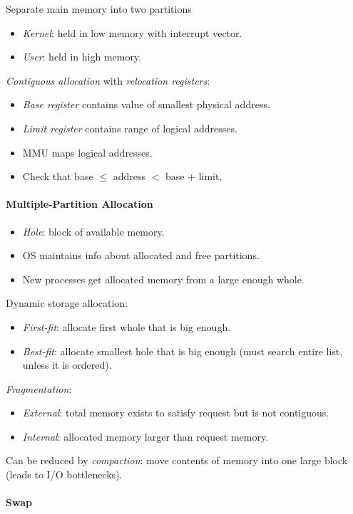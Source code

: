 \documentclass[twocolumn,english]{article}
\begin{document}
Separate main memory into two partitions
\begin{itemize}
\item \emph{Kernel}: held in low memory with interrupt vector.
\item \emph{User}: held in high memory.
\end{itemize}
\emph{Contiguous allocation} with \emph{relocation registers}:
\begin{itemize}
\item \emph{Base register} contains value of smallest physical address.
\item \emph{Limit register} contains range of logical addresses.
\item MMU maps logical addresses.
\item Check that base $\leq$ address $<$ base + limit.
\end{itemize}

\paragraph{Multiple-Partition Allocation}
\begin{itemize}
\item \emph{Hole}: block of available memory.
\item OS maintains info about allocated and free partitions.
\item New processes get allocated memory from a large enough whole.
\end{itemize}
Dynamic storage allocation:
\begin{itemize}
\item \emph{First-fit}: allocate first whole that is big enough.
\item \emph{Best-fit}: allocate smallest hole that is big enough (must search
entire list, unless it is ordered).
\end{itemize}
\emph{Fragmentation}:
\begin{itemize}
\item \emph{External}: total memory exists to satisfy request but is not
contiguous.
\item \emph{Internal}: allocated memory larger than request memory.
\end{itemize}
Can be reduced by \emph{compaction}: move contents of memory into
one large block (leads to I/O bottlenecks).

\paragraph{Swap}
\end{document}
